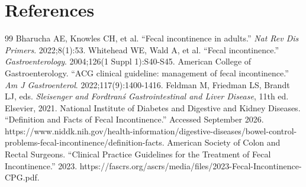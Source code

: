 \section*{References}
\begin{thebibliography}{99}
 Bharucha AE, Knowles CH, et al. ``Fecal incontinence in adults.'' \textit{Nat Rev Dis Primers}. 2022;8(1):53.
 Whitehead WE, Wald A, et al. ``Fecal incontinence.'' \textit{Gastroenterology}. 2004;126(1 Suppl 1):S40-S45.
 American College of Gastroenterology. ``ACG clinical guideline: management of fecal incontinence.'' \textit{Am J Gastroenterol}. 2022;117(9):1400-1416.
 Feldman M, Friedman LS, Brandt LJ, eds. \textit{Sleisenger and Fordtran\'s Gastrointestinal and Liver Disease}, 11th ed. Elsevier, 2021.
 National Institute of Diabetes and Digestive and Kidney Diseases. ``Definition and Facts of Fecal Incontinence.'' Accessed September 2026. https://www.niddk.nih.gov/health-information/digestive-diseases/bowel-control-problems-fecal-incontinence/definition-facts.
 American Society of Colon and Rectal Surgeons. ``Clinical Practice Guidelines for the Treatment of Fecal Incontinence.'' 2023. https://fascrs.org/ascrs/media/files/2023-Fecal-Incontinence-CPG.pdf.
\end{thebibliography}
